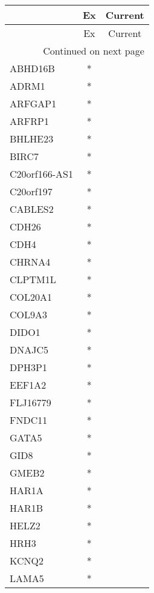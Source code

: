 \begin{longtable}{lcc}
\toprule
{} & Ex & Current \\
\midrule
\endfirsthead

\toprule
{} & Ex & Current \\
\midrule
\endhead
\midrule
\multicolumn{3}{r}{{Continued on next page}} \\
\midrule
\endfoot

\bottomrule
\endlastfoot
ABHD16B        &  * &         \\
ADRM1          &  * &         \\
ARFGAP1        &  * &         \\
ARFRP1         &  * &         \\
BHLHE23        &  * &         \\
BIRC7          &  * &         \\
C20orf166-AS1  &  * &         \\
C20orf197      &  * &         \\
CABLES2        &  * &         \\
CDH26          &  * &         \\
CDH4           &  * &         \\
CHRNA4         &  * &         \\
CLPTM1L        &  * &         \\
COL20A1        &  * &         \\
COL9A3         &  * &         \\
DIDO1          &  * &         \\
DNAJC5         &  * &         \\
DPH3P1         &  * &         \\
EEF1A2         &  * &         \\
FLJ16779       &  * &         \\
FNDC11         &  * &         \\
GATA5          &  * &         \\
GID8           &  * &         \\
GMEB2          &  * &         \\
HAR1A          &  * &         \\
HAR1B          &  * &         \\
HELZ2          &  * &         \\
HRH3           &  * &         \\
KCNQ2          &  * &         \\
LAMA5          &  * &         \\

\end{longtable}
